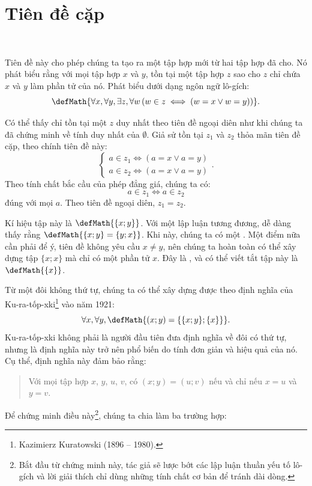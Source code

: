 \section{Tiên đề cặp}

\ 

Tiên đề này cho phép chúng ta tạo ra một tập hợp mới từ hai tập hợp đã cho. Nó phát biểu rằng với mọi tập hợp $x$ và $y$, tồn tại một tập hợp $z$ sao cho $z$ chỉ chứa $x$ và $y$ làm phần tử của nó. Phát biểu dưới dạng ngôn ngữ lô-gích:
\begin{equation*}
    \defMath{\forall x, \forall y, \exists z, \forall w \left( w \in z \iff (w = x \lor w = y) \right)}.
\end{equation*}

Có thể thấy chỉ tồn tại một $z$ duy nhất theo tiên đề ngoại diên như khi chúng ta đã chứng minh về tính duy nhất của $\emptyset$. Giả sử tồn tại $z_1$ và $z_2$ thỏa mãn tiên đề cặp, theo chính tiên đề này:
\begin{equation*}
    \begin{cases}
        a \in z_1 \iff (a = x \lor a = y) \\
        a \in z_2 \iff (a = x \lor a = y)
    \end{cases}.
\end{equation*}
Theo tính chất bắc cầu của phép đẳng giá, chúng ta có:
$$
a \in z_1 \iff a \in z_2
$$
đúng với mọi $a$. Theo tiên đề ngoại diên, $z_1 = z_2$.

Kí hiệu tập này là $\defMath{\{x; y\}}$. Với một lập luận tương đương, dễ dàng thấy rằng $\defMath{\{x; y\} = \{y; x\}}$. Khi này, chúng ta có một . Một điểm nữa cần phải để ý, tiên đề không yêu cầu $x \neq y$, nên chúng ta hoàn toàn có thể xây dựng tập $\{x; x\}$ mà chỉ có một phần tử $x$. Đây là , và có thể viết tắt tập này là $\defMath{\{x\}}$.

Từ một đôi không thứ tự, chúng ta có thể xây dựng được  theo định nghĩa của Ku-ra-tốp-xki\footnote{Kazimierz Kuratowski (1896 -- 1980).} vào năm 1921: $$\forall x, \forall y,\defMath{(x; y) = \{\{x; y\}; \{x\}\}}.$$
Ku-ra-tốp-xki không phải là người đầu tiên đưa định nghĩa về đôi có thứ tự, nhưng là định nghĩa này trở nên phổ biến do tính đơn giản và hiệu quả của nó. Cụ thể, định nghĩa này đảm bảo rằng:
\begin{quotation}
    Với mọi tập hợp $x$, $y$, $u$, $v$, có $(x; y) = (u; v)$ nếu và chỉ nếu $x = u$ và $y = v$.
\end{quotation}
Để chứng minh điều này\footnote{Bắt đầu từ chứng minh này, tác giả sẽ lược bớt các lập luận thuần yếu tố lô-gích và lời giải thích chỉ dùng những tính chất cơ bản để tránh dài dòng.}, chúng ta chia làm ba trường hợp:

